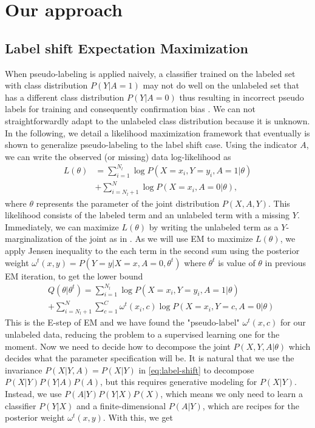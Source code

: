 \section{Our approach}
\label{sec:method}
\subsection{Label shift Expectation Maximization}
\label{subsec:em}
When pseudo-labeling is applied naively, a classifier trained on the labeled set with class distribution $P(Y|A=1)$ may not do well on the unlabeled set that has a different class distribution $P(Y|A=0)$ thus resulting in incorrect pseudo labels for training and consequently confirmation bias \cite{confirmationbias}. We can not straightforwardly adapt to the unlabeled class distribution because it is unknown. In the following, we detail a likelihood maximization framework that eventually is shown to generalize pseudo-labeling to the label shift case. Using the indicator $A$, we can write the observed (or missing) data log-likelihood as
\begin{equation}
\begin{aligned}
L(\theta) &= \sum_{i=1}^{N_l} \log P(X=x_i,Y=y_i, A=1 | \theta)\\
&+ \sum_{i=N_l+1}^N \log P(X=x_i, A=0 | \theta),
\label{eq:likelihood}
\end{aligned}
\end{equation}
where $\theta$ represents the parameter of the joint distribution $P(X,A,Y)$. This likelihood consists of the labeled term and an unlabeled term with a missing $Y$. Immediately, we can maximize $L(\theta)$ by writing the unlabeled term as a $Y$-marginalization of the joint as in \cite{arelabelsinformative}. As we will use EM to maximize $L(\theta)$, we apply Jensen inequality to the each term in the second sum using the posterior weight $\omega^t(x,y) = P(Y=y|X=x,A=0,\theta^t)$ where $\theta^t$ is value of $\theta$ in previous EM iteration, to get the lower bound
\vspace*{-.15in}
\begin{equation}
\begin{aligned}
&Q(\theta|\theta^t) = \sum_{i=1}^{N_l} \log P(X=x_i, Y=y_i, A=1 | \theta)\\
&+ \sum_{i=N_l+1}^N \sum_{c=1}^C \omega^t(x_i,c) \log P(X=x_i, Y=c, A=0 | \theta)
\label{eq:e-step}
\end{aligned}
\end{equation}
This is the E-step of EM and we have found the "pseudo-label" $\omega^t(x,c)$ for our unlabeled data, reducing the problem to a supervised learning one for the moment. Now we need to decide how to decompose the joint $P(X,Y,A|\theta)$ which decides what the parameter specification will be. It is natural that we use the invariance $P(X|Y,A) = P(X|Y)$ in \cref{eq:label-shift} to decompose $P(X|Y)P(Y|A)P(A)$, but this requires generative modeling for $P(X|Y)$. Instead, we use $P(A|Y)P(Y|X)P(X)$, which means we only need to learn a classifier $P(Y|X)$ and a finite-dimensional $P(A|Y)$, which are recipes for the posterior weight $\omega^t(x,y)$. With this, we get
